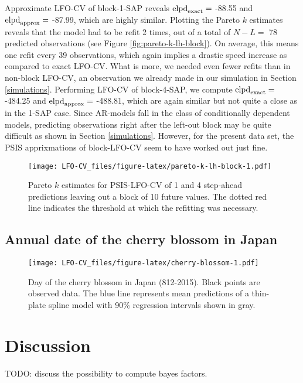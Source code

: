 \documentclass[american,]{article}
\begin{document}
Approximate LFO-CV of block-1-SAP reveals \({\rm elpd}_{\rm exact} =\)
-88.55 and \({\rm elpd}_{\rm approx} =\) -87.99, which are highly
similar. Plotting the Pareto \(k\) estimates reveals that the model had
to be refit 2 times, out of a total of \(N - L =\) 78 predicted
observations (see Figure \ref{fig:pareto-k-lh-block}). On average, this
means one refit every 39 observations, which again implies a drastic
speed increase as compared to exact LFO-CV. What is more, we needed even
fewer refits than in non-block LFO-CV, an observation we already made in
our simulation in Section \ref{simulations}. Performing LFO-CV of
block-4-SAP, we compute \({\rm elpd}_{\rm exact} =\) -484.25 and
\({\rm elpd}_{\rm approx} =\) -488.81, which are again similar but not
quite a close as in the 1-SAP case. Since AR-models fall in the class of
conditionally dependent models, predicting observations right after the
left-out block may be quite difficult as shown in Section
\ref{simulations}. However, for the present data set, the PSIS
apprixmations of block-LFO-CV seem to have worked out just fine.

\begin{figure}
\centering
\texttt{[image: LFO-CV\_files/figure-latex/pareto-k-lh-block-1.pdf]}
\caption{Pareto \(k\) estimates for PSIS-LFO-CV of 1 and 4 step-ahead
predictions leaving out a block of 10 future values. The dotted red line
indicates the threshold at which the refitting was necessary.}
\end{figure}

\hypertarget{annual-date-of-the-cherry-blossom-in-japan}{%
\subsection{Annual date of the cherry blossom in
Japan}\label{annual-date-of-the-cherry-blossom-in-japan}}

\begin{figure}
\centering
\texttt{[image: LFO-CV\_files/figure-latex/cherry-blossom-1.pdf]}
\caption{Day of the cherry blossom in Japan (812-2015). Black points are
observed data. The blue line represents mean predictions of a thin-plate
spline model with 90\% regression intervals shown in gray.}
\end{figure}

\hypertarget{discussion}{%
\section{Discussion}\label{discussion}}

TODO: discuss the possibility to compute bayes factors.

\newpage

\hypertarget{refs}{}


\end{document}
